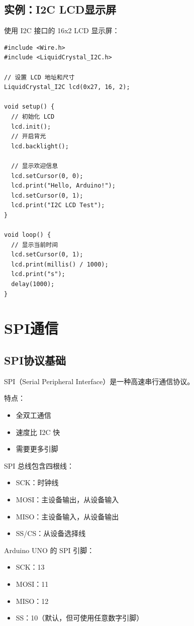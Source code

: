 \documentclass[12pt,UTF8]{ctexbook}
\begin{document}
\section{实例：I2C LCD显示屏}

使用 I2C 接口的 16x2 LCD 显示屏：

\begin{lstlisting}
#include <Wire.h>
#include <LiquidCrystal_I2C.h>

// 设置 LCD 地址和尺寸
LiquidCrystal_I2C lcd(0x27, 16, 2);

void setup() {
  // 初始化 LCD
  lcd.init();
  // 开启背光
  lcd.backlight();
  
  // 显示欢迎信息
  lcd.setCursor(0, 0);
  lcd.print("Hello, Arduino!");
  lcd.setCursor(0, 1);
  lcd.print("I2C LCD Test");
}

void loop() {
  // 显示当前时间
  lcd.setCursor(0, 1);
  lcd.print(millis() / 1000);
  lcd.print("s");
  delay(1000);
}
\end{lstlisting}

\chapter{SPI通信}

\section{SPI协议基础}

SPI（Serial Peripheral Interface）是一种高速串行通信协议。

特点：
\begin{itemize}
    \item 全双工通信
    \item 速度比 I2C 快
    \item 需要更多引脚
\end{itemize}

SPI 总线包含四根线：
\begin{itemize}
    \item SCK：时钟线
    \item MOSI：主设备输出，从设备输入
    \item MISO：主设备输入，从设备输出
    \item SS/CS：从设备选择线
\end{itemize}

Arduino UNO 的 SPI 引脚：
\begin{itemize}
    \item SCK：13
    \item MOSI：11
    \item MISO：12
    \item SS：10（默认，但可使用任意数字引脚）
\end{itemize}
\end{document}
